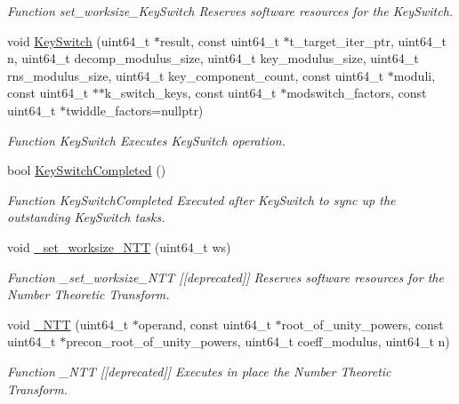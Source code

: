 \begin{DoxyCompactItemize}
\begin{DoxyCompactList}\small\item\em Function set\-\_\-worksize\-\_\-\-Key\-Switch Reserves software resources for the Key\-Switch. \end{DoxyCompactList}\item 
void \hyperlink{namespaceintel_1_1hexl_aafddb377dcb2c351cfc3e014428cfe42}{Key\-Switch} (uint64\-\_\-t $\ast$result, const uint64\-\_\-t $\ast$t\-\_\-target\-\_\-iter\-\_\-ptr, uint64\-\_\-t n, uint64\-\_\-t decomp\-\_\-modulus\-\_\-size, uint64\-\_\-t key\-\_\-modulus\-\_\-size, uint64\-\_\-t rns\-\_\-modulus\-\_\-size, uint64\-\_\-t key\-\_\-component\-\_\-count, const uint64\-\_\-t $\ast$moduli, const uint64\-\_\-t $\ast$$\ast$k\-\_\-switch\-\_\-keys, const uint64\-\_\-t $\ast$modswitch\-\_\-factors, const uint64\-\_\-t $\ast$twiddle\-\_\-factors=nullptr)
\begin{DoxyCompactList}\small\item\em Function Key\-Switch Executes Key\-Switch operation. \end{DoxyCompactList}\item 
bool \hyperlink{namespaceintel_1_1hexl_ad36db7f99d2e70414645f961b723ab79}{Key\-Switch\-Completed} ()
\begin{DoxyCompactList}\small\item\em Function Key\-Switch\-Completed Executed after Key\-Switch to sync up the outstanding Key\-Switch tasks. \end{DoxyCompactList}\item 
void \hyperlink{namespaceintel_1_1hexl_aeaae249dd080bb7cb40aea745c3df207}{\-\_\-set\-\_\-worksize\-\_\-\-N\-T\-T} (uint64\-\_\-t ws)
\begin{DoxyCompactList}\small\item\em Function \-\_\-set\-\_\-worksize\-\_\-\-N\-T\-T \mbox{[}\mbox{[}deprecated\mbox{]}\mbox{]} Reserves software resources for the Number Theoretic Transform. \end{DoxyCompactList}\item 
void \hyperlink{namespaceintel_1_1hexl_a8d7f5d51e5d7683ea691f86ef57d2c40}{\-\_\-\-N\-T\-T} (uint64\-\_\-t $\ast$operand, const uint64\-\_\-t $\ast$root\-\_\-of\-\_\-unity\-\_\-powers, const uint64\-\_\-t $\ast$precon\-\_\-root\-\_\-of\-\_\-unity\-\_\-powers, uint64\-\_\-t coeff\-\_\-modulus, uint64\-\_\-t n)
\begin{DoxyCompactList}\small\item\em Function \-\_\-\-N\-T\-T \mbox{[}\mbox{[}deprecated\mbox{]}\mbox{]} Executes in place the Number Theoretic Transform. \end{DoxyCompactList}\item 
$$
\end{DoxyCompactItemize}
